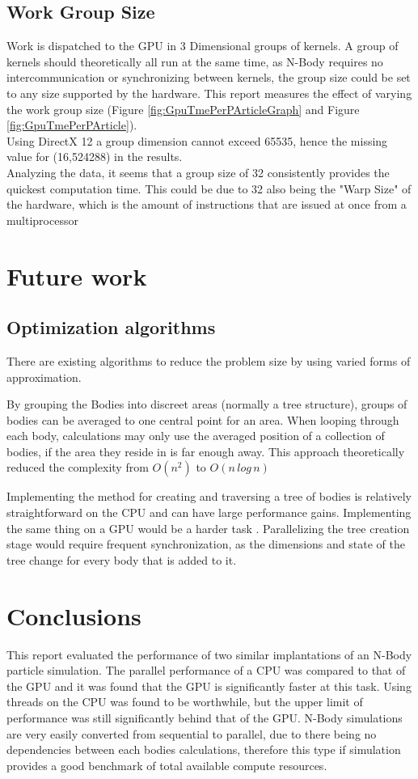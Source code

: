 \documentclass[conference]{acmsiggraph}
\begin{document}
\subsection{Work Group Size}
Work is dispatched to the GPU in 3 Dimensional groups of kernels. 
A group of kernels should theoretically all run at the same time, as N-Body requires no intercommunication or synchronizing between kernels, the group size could be set to any size supported by the hardware.
This report measures the effect of varying the work group size (Figure \ref{fig:GpuTmePerPArticleGraph} and Figure \ref{fig:GpuTmePerPArticle}).
\\ 
Using DirectX 12 a group dimension cannot exceed 65535, hence the missing value for (16,524288) in the results.
\\
Analyzing the data, it seems that a group size of 32 consistently provides the quickest computation time. This could be due to 32 also being the "Warp Size" of the hardware, which is the amount of instructions that are issued at once from a multiprocessor

\section{Future work}

\subsection{Optimization algorithms}
There are existing algorithms to reduce the problem size by using varied forms of approximation.

By grouping the Bodies into discreet areas (normally a tree structure), groups of bodies can be averaged to one central point for an area. When looping through each body, calculations may only use the averaged position of a collection of bodies, if the area they reside in is far enough away.
This approach theoretically reduced the complexity from $O(n^2)$ to $O(n\,log \,n)$
\cite{1986Natur.324..446B}

Implementing the method for creating and traversing a tree of bodies is relatively straightforward on the CPU and can have large performance gains. Implementing the same thing on a GPU would be a harder task \cite{goodcite}. Parallelizing the tree creation stage would require frequent synchronization, as the dimensions and state of the tree change for every body that is added to it.

\section{Conclusions}
This report evaluated the performance of two similar implantations of an N-Body particle simulation. The parallel performance of a CPU was compared to that of the GPU and it was found that the GPU is significantly faster at this task. Using threads on the CPU was found to be worthwhile, but the upper limit of performance was still significantly behind that of the GPU.
N-Body simulations are very easily converted from sequential to parallel, due to there being no dependencies between each bodies calculations, therefore this type if simulation provides a good benchmark of total available compute resources.
\end{document}

